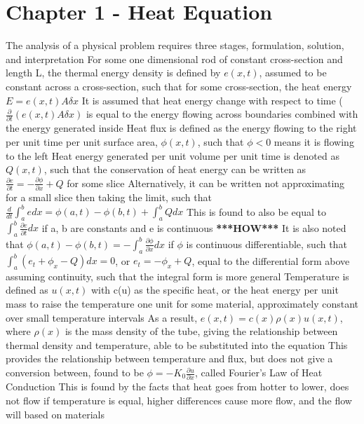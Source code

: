 \documentclass[11 pt, twoside]{article}
\newenvironment{outline*}
{
	\begin{outline}[enumerate]
	}
	{\end{outline}
}
\begin{document}
\section{Chapter 1 - Heat Equation}
\begin{outline*}
\1 The analysis of a physical problem requires three stages, formulation, solution, and interpretation
\1 For some one dimensional rod of constant cross-section and length L, the thermal energy density is defined by $e(x, t)$, assumed to be constant across a cross-section, such that for some cross-section, the heat energy $E = e(x, t)A\delta x$
	\2 It is assumed that heat energy change with respect to time ($\frac{\partial }{\partial t}(e(x, t)A\delta x)$ is equal to the energy flowing across boundaries combined with the energy generated inside
	\2 Heat flux is defined as the energy flowing to the right per unit time per unit surface area, $\phi (x, t)$, such that $\phi < 0$ means it is flowing to the left
	\2 Heat energy generated per unit volume per unit time is denoted as $Q(x, t)$, such that the conservation of heat energy can be written as $\frac{\partial e}{\partial t} = -\frac{\partial \phi}{\partial x} + Q$ for some slice
		\3 Alternatively, it can be written not approximating for a small slice then taking the limit, such that $\frac{d}{dt} \int^b_a edx = \phi(a, t) - \phi(b, t) + \int^b_a Q dx$
		\3 This is found to also be equal to $\int^b_a \frac{\partial e}{\partial t}dx$ if a, b are constants and e is continuous \textbf{***HOW***}
		\3 It is also noted that $\phi(a, t) - \phi(b, t) = -\int^b_a \frac{\partial \phi}{\partial x}dx$ if $\phi$ is continuous differentiable, such that $\int^b_a (e_t + \phi_x - Q)dx = 0$, or $e_t = -\phi_x + Q$, equal to the differential form above assuming continuity, such that the integral form is more general
	\2 Temperature is defined as $u(x, t)$ with c(u) as the specific heat, or the heat energy per unit mass to raise the temperature one unit for some material, approximately constant over small temperature intervals
		\3 As a result, $e(x, t) = c(x)\rho(x)u(x, t)$, where $\rho(x)$ is the mass density of the tube, giving the relationship between thermal density and temperature, able to be substituted into the equation
	\2 This provides the relationship between temperature and flux, but does not give a conversion between, found to be $\phi = -K_0 \frac{\partial u}{\partial x}$, called Fourier's Law of Heat Conduction
		\3 This is found by the facts that heat goes from hotter to lower, does not flow if temperature is equal, higher differences cause more flow, and the flow will based on materials

\end{outline*}
\end{document}

